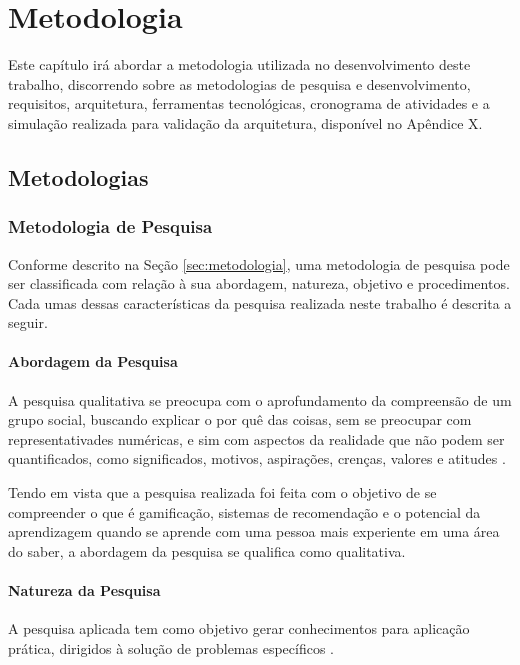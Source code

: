 \chapter[Metodologia]{Metodologia}
\label{cap:metodologia}
Este capítulo irá abordar a metodologia utilizada no desenvolvimento deste trabalho, discorrendo sobre as metodologias de pesquisa e desenvolvimento, requisitos, arquitetura, ferramentas tecnológicas, cronograma de atividades e a simulação realizada para validação da arquitetura, disponível no Apêndice X.

\section[Metodologias]{Metodologias}
\label{sec:metodologia-proposta}
\subsection[Metodologia de Pesquisa]{Metodologia de Pesquisa}
Conforme descrito na Seção \ref{sec:metodologia}, uma metodologia de pesquisa pode ser classificada com relação à sua abordagem, natureza, objetivo e procedimentos. Cada umas dessas características da pesquisa realizada neste trabalho é descrita a seguir.

\subsubsection[Abordagem da Pesquisa]{Abordagem da Pesquisa}

A pesquisa qualitativa se preocupa com o aprofundamento da compreensão de um grupo social, buscando explicar o por quê das coisas, sem se preocupar com representativades numéricas, e sim com aspectos da realidade que não podem ser quantificados, como significados, motivos, aspirações, crenças, valores e atitudes \cite{gerhardt2009metodos}.

Tendo em vista que a pesquisa realizada foi feita com o objetivo de se compreender o que é gamificação, sistemas de recomendação e o potencial da aprendizagem quando se aprende com uma pessoa mais experiente em uma área do saber, a abordagem da pesquisa se qualifica como qualitativa.

\subsubsection[Natureza da Pesquisa]{Natureza da Pesquisa}

A pesquisa aplicada tem como objetivo gerar conhecimentos para aplicação prática, dirigidos à solução de problemas específicos \cite{gerhardt2009metodos}.

